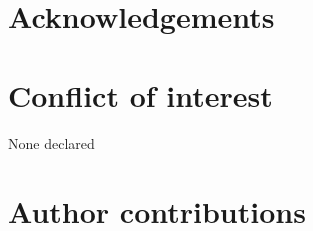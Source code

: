\section*{Acknowledgements}
\label{sec:acknowl1}

\section*{Conflict of interest}
\label{sec:conflict1}

None declared

\section*{Author contributions}
\label{sec:author1}

\cleardoublepage


\begin{otherlanguage}{english}


\end{otherlanguage}
